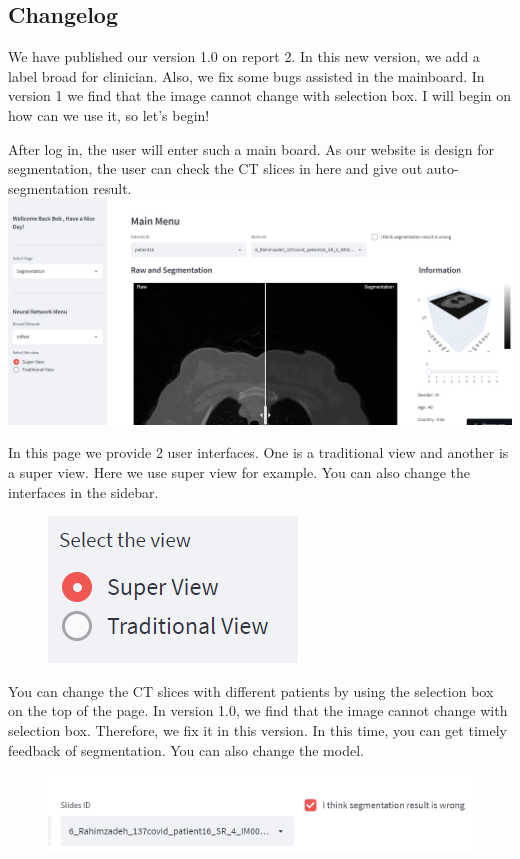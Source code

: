 \documentclass[
]{dtuposter}
\begin{document}
\begin{dtupostercontent}
\section{Changelog}
We have published our version 1.0 on report 2. In this new version, we add a label broad for clinician. Also, we fix some bugs assisted in the mainboard. In version 1 we find that the image cannot change with selection box. I will begin on how can we use it, so let’s begin!
\par{After log in, the user will enter such a main board. As our website is design for segmentation, the user can check the CT slices in here and give out auto-segmentation result.}
\includegraphics[width=1\linewidth, origin=c]{external/figure/mainbox.png}
\par{In this page we provide 2 user interfaces. One is a traditional view and another is a super view. Here we use super view for example. You can also change the interfaces in the sidebar.}
\begin{figure}
    \centering\includegraphics[width=.5\linewidth, origin=c]{external/figure/viewselec.png}
\end{figure}
\par{You can change the CT slices with different patients by using the selection box on the top of the page. In version 1.0, we find that the image cannot change with selection box. Therefore, we fix it in this version. In this time, you can get timely feedback of segmentation. You can also change the model. }
\begin{figure}
    \centering\includegraphics[width=\linewidth, origin=c]{external/figure/changingbutton.png}

\end{figure}
\end{dtupostercontent}
\end{document}
